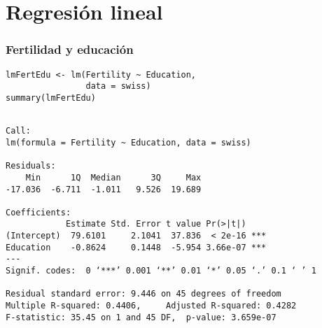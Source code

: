 \documentclass{beamer}
\begin{document}
\section{Regresión lineal}
\label{sec-3}
\begin{frame}[fragile]
\frametitle{Fertilidad y educación}
\label{sec-3-1}


\lstset{language=R}
\begin{lstlisting}
lmFertEdu <- lm(Fertility ~ Education,
                data = swiss)
summary(lmFertEdu)
\end{lstlisting}


\begin{verbatim}

Call:
lm(formula = Fertility ~ Education, data = swiss)

Residuals:
    Min      1Q  Median      3Q     Max 
-17.036  -6.711  -1.011   9.526  19.689 

Coefficients:
            Estimate Std. Error t value Pr(>|t|)    
(Intercept)  79.6101     2.1041  37.836  < 2e-16 ***
Education    -0.8624     0.1448  -5.954 3.66e-07 ***
---
Signif. codes:  0 ‘***’ 0.001 ‘**’ 0.01 ‘*’ 0.05 ‘.’ 0.1 ‘ ’ 1 

Residual standard error: 9.446 on 45 degrees of freedom
Multiple R-squared: 0.4406,     Adjusted R-squared: 0.4282 
F-statistic: 35.45 on 1 and 45 DF,  p-value: 3.659e-07
\end{verbatim}
\end{frame}
\end{document}
